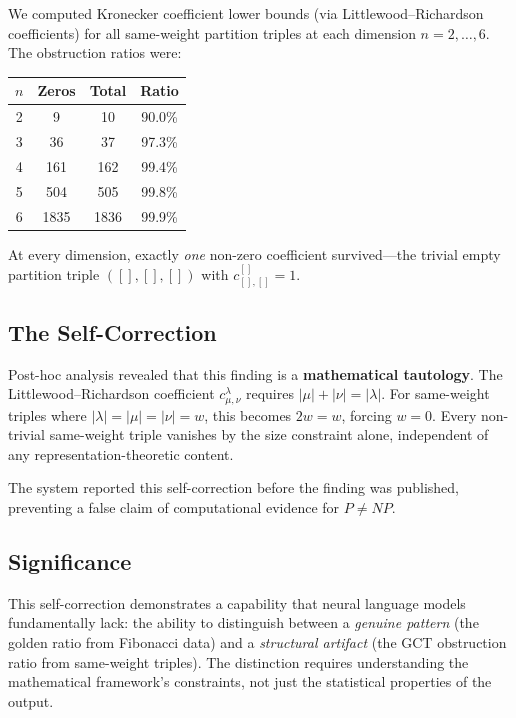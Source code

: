 \documentclass[11pt,a4paper]{article}
\begin{document}
We computed Kronecker coefficient lower bounds (via Littlewood--Richardson
coefficients) for all same-weight partition triples at each dimension
$n = 2, \ldots, 6$. The obstruction ratios were:

\begin{center}
\begin{tabular}{cccc}
  \toprule
  $n$ & Zeros & Total & Ratio \\
  \midrule
  2 & 9 & 10 & 90.0\% \\
  3 & 36 & 37 & 97.3\% \\
  4 & 161 & 162 & 99.4\% \\
  5 & 504 & 505 & 99.8\% \\
  6 & 1835 & 1836 & 99.9\% \\
  \bottomrule
\end{tabular}
\end{center}

At every dimension, exactly \emph{one} non-zero coefficient survived---the
trivial empty partition triple $([], [], [])$ with $c^{[]}_{[],[]} = 1$.

\subsection{The Self-Correction}

Post-hoc analysis revealed that this finding is a \textbf{mathematical
tautology}. The Littlewood--Richardson coefficient
$c^{\lambda}_{\mu, \nu}$ requires $|\mu| + |\nu| = |\lambda|$. For
same-weight triples where $|\lambda| = |\mu| = |\nu| = w$, this becomes
$2w = w$, forcing $w = 0$. Every non-trivial same-weight triple vanishes
by the size constraint alone, independent of any representation-theoretic
content.

The system reported this self-correction before the finding was published,
preventing a false claim of computational evidence for $P \neq NP$.

\subsection{Significance}

This self-correction demonstrates a capability that neural language models
fundamentally lack: the ability to distinguish between a \emph{genuine
pattern} (the golden ratio from Fibonacci data) and a \emph{structural
artifact} (the GCT obstruction ratio from same-weight triples). The
distinction requires understanding the mathematical framework's constraints,
not just the statistical properties of the output.
\end{document}
